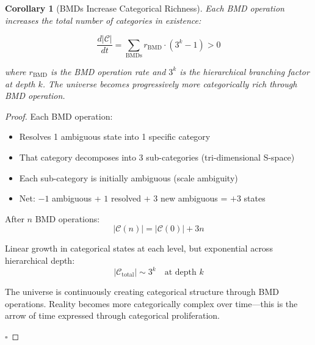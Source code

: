 \documentclass[12pt,a4paper]{article}
\newtheorem{corollary}[theorem]{Corollary}
\begin{document}
\begin{corollary}[BMDs Increase Categorical Richness]
\label{cor:categorical_increase}
Each BMD operation increases the total number of categories in existence:

\begin{equation}
\frac{d|\mathcal{C}|}{dt} = \sum_{\text{BMDs}} r_{\text{BMD}} \cdot (3^k - 1) > 0
\end{equation}

where $r_{\text{BMD}}$ is the BMD operation rate and $3^k$ is the hierarchical branching factor at depth $k$. The universe becomes progressively more categorically rich through BMD operation.
\end{corollary}

\begin{proof}
Each BMD operation:
\begin{itemize}
\item Resolves 1 ambiguous state into 1 specific category
\item That category decomposes into 3 sub-categories (tri-dimensional S-space)
\item Each sub-category is initially ambiguous (scale ambiguity)
\item Net: $-1$ ambiguous + $1$ resolved + $3$ new ambiguous = $+3$ states
\end{itemize}

After $n$ BMD operations:
\begin{equation}
|\mathcal{C}(n)| = |\mathcal{C}(0)| + 3n
\end{equation}

Linear growth in categorical states at each level, but exponential across hierarchical depth:
\begin{equation}
|\mathcal{C}_{\text{total}}| \sim 3^k \quad \text{at depth } k
\end{equation}

The universe is continuously creating categorical structure through BMD operations. Reality becomes more categorically complex over time—this is the arrow of time expressed through categorical proliferation.

$\square$
\end{proof}
\end{document}

